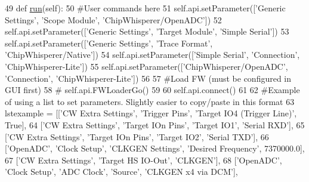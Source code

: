\begin{DoxyCode}
49     \textcolor{keyword}{def }\hyperlink{classsoftware_1_1chipwhisperer_1_1capture_1_1scripts_1_1cwlite-simpleserialxmega_1_1UserScript_a2a474f622cc6dabb5c18ff0413404cca}{run}(self):
50         \textcolor{comment}{#User commands here}
51         self.api.setParameter([\textcolor{stringliteral}{'Generic Settings'}, \textcolor{stringliteral}{'Scope Module'}, \textcolor{stringliteral}{'ChipWhisperer/OpenADC'}])
52         self.api.setParameter([\textcolor{stringliteral}{'Generic Settings'}, \textcolor{stringliteral}{'Target Module'}, \textcolor{stringliteral}{'Simple Serial'}])
53         self.api.setParameter([\textcolor{stringliteral}{'Generic Settings'}, \textcolor{stringliteral}{'Trace Format'}, \textcolor{stringliteral}{'ChipWhisperer/Native'}])
54         self.api.setParameter([\textcolor{stringliteral}{'Simple Serial'}, \textcolor{stringliteral}{'Connection'}, \textcolor{stringliteral}{'ChipWhisperer-Lite'}])
55         self.api.setParameter([\textcolor{stringliteral}{'ChipWhisperer/OpenADC'}, \textcolor{stringliteral}{'Connection'}, \textcolor{stringliteral}{'ChipWhisperer-Lite'}])
56 
57         \textcolor{comment}{#Load FW (must be configured in GUI first)}
58         \textcolor{comment}{# self.api.FWLoaderGo()}
59                 
60         self.api.connect()
61         
62         \textcolor{comment}{#Example of using a list to set parameters. Slightly easier to copy/paste in this format}
63         lstexample = [[\textcolor{stringliteral}{'CW Extra Settings'}, \textcolor{stringliteral}{'Trigger Pins'}, \textcolor{stringliteral}{'Target IO4 (Trigger Line)'}, \textcolor{keyword}{True}],
64                       [\textcolor{stringliteral}{'CW Extra Settings'}, \textcolor{stringliteral}{'Target IOn Pins'}, \textcolor{stringliteral}{'Target IO1'}, \textcolor{stringliteral}{'Serial RXD'}],
65                       [\textcolor{stringliteral}{'CW Extra Settings'}, \textcolor{stringliteral}{'Target IOn Pins'}, \textcolor{stringliteral}{'Target IO2'}, \textcolor{stringliteral}{'Serial TXD'}],
66                       [\textcolor{stringliteral}{'OpenADC'}, \textcolor{stringliteral}{'Clock Setup'}, \textcolor{stringliteral}{'CLKGEN Settings'}, \textcolor{stringliteral}{'Desired Frequency'}, 7370000.0],
67                       [\textcolor{stringliteral}{'CW Extra Settings'}, \textcolor{stringliteral}{'Target HS IO-Out'}, \textcolor{stringliteral}{'CLKGEN'}],
68                       [\textcolor{stringliteral}{'OpenADC'}, \textcolor{stringliteral}{'Clock Setup'}, \textcolor{stringliteral}{'ADC Clock'}, \textcolor{stringliteral}{'Source'}, \textcolor{stringliteral}{'CLKGEN x4 via DCM'}],

\end{DoxyCode}
